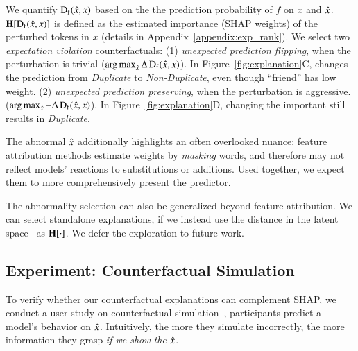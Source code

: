 We quantify $\operatorname*{D_f}(\hat{x}, x)$ based on the the prediction probability of $f$ on $x$ and $\hat{x}$.
$\operatorname*{\mathbf{H}}[\operatorname*{D_f}(\hat{x}, x)]$ is defined as the estimated importance (SHAP weights) of the perturbed tokens in $x$ (details in Appendix~\ref{appendix:exp_rank}).
We select two \emph{expectation violation} counterfactuals: %
(1) \emph{unexpected prediction flipping}, when the perturbation is trivial ($\operatorname*{arg\,max}_{\hat{x}} \Delta\operatorname*{D_f}(\hat{x}, x)$).
In Figure~\ref{fig:explanation}C,  changes the prediction from \emph{Duplicate} to \emph{Non-Duplicate}, even though ``friend'' has low weight.
(2) \emph{unexpected prediction preserving}, when the perturbation is aggressive. ($\operatorname*{arg\,max}_{\hat{x}} -\Delta\operatorname*{D_f}(\hat{x}, x)$).
In Figure~\ref{fig:explanation}D, changing the important  still results in \emph{Duplicate}.

The abnormal $\hat{x}$ additionally highlights an often overlooked nuance: feature attribution methods estimate weights by \emph{masking} words, and therefore may not reflect models' reactions to substitutions or additions.
Used together, we expect them to more comprehensively present the predictor.

The abnormality selection can also be generalized beyond feature attribution.
We can select standalone explanations, if we instead use the distance in the latent space~\cite{reimers-2019-sentence-bert} as $\operatorname*{\mathbf{H}}[\boldsymbol{\cdot}]$.
We defer the exploration to future work.


\subsection{Experiment: Counterfactual Simulation}
\label{subsec:exp_user_study}

To verify whether our counterfactual explanations can complement SHAP, we conduct a user study on counterfactual simulation~\cite{hase2020evaluating}, \ie participants predict a model's behavior on $\hat{x}$.
Intuitively, the more they simulate incorrectly, the more information they grasp \emph{if we show the $\hat{x}$}.


